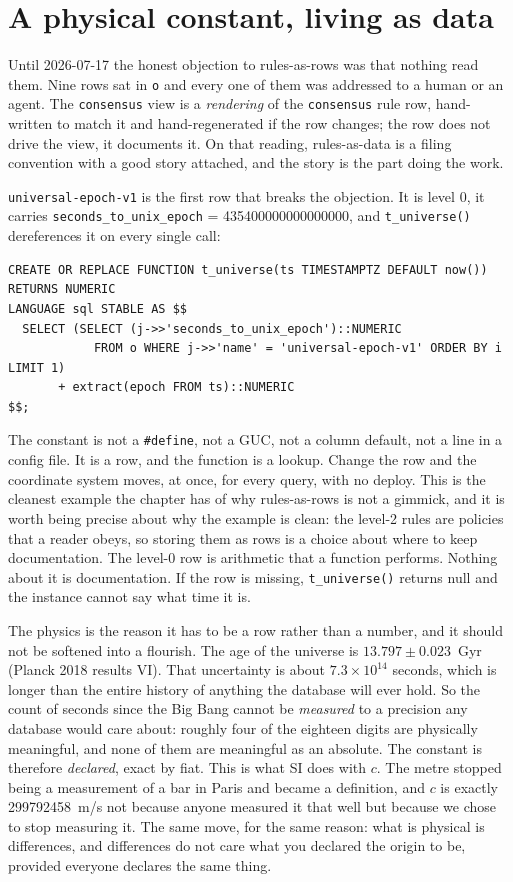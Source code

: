 \section{A physical constant, living as data}

Until 2026-07-17 the honest objection to rules-as-rows was that nothing read them. Nine rows sat in \texttt{o} and every one of them was addressed to a human or an agent. The \texttt{consensus} view is a \emph{rendering} of the \texttt{consensus} rule row, hand-written to match it and hand-regenerated if the row changes; the row does not drive the view, it documents it. On that reading, rules-as-data is a filing convention with a good story attached, and the story is the part doing the work.

\texttt{universal-epoch-v1} is the first row that breaks the objection. It is level 0, it carries \texttt{seconds\_to\_unix\_epoch} = 435400000000000000, and \texttt{t\_universe()} dereferences it on every single call:

\begin{verbatim}
CREATE OR REPLACE FUNCTION t_universe(ts TIMESTAMPTZ DEFAULT now()) RETURNS NUMERIC
LANGUAGE sql STABLE AS $$
  SELECT (SELECT (j->>'seconds_to_unix_epoch')::NUMERIC
            FROM o WHERE j->>'name' = 'universal-epoch-v1' ORDER BY i LIMIT 1)
       + extract(epoch FROM ts)::NUMERIC
$$;
\end{verbatim}

The constant is not a \texttt{\#define}, not a GUC, not a column default, not a line in a config file. It is a row, and the function is a lookup. Change the row and the coordinate system moves, at once, for every query, with no deploy. This is the cleanest example the chapter has of why rules-as-rows is not a gimmick, and it is worth being precise about why the example is clean: the level-2 rules are policies that a reader obeys, so storing them as rows is a choice about where to keep documentation. The level-0 row is arithmetic that a function performs. Nothing about it is documentation. If the row is missing, \texttt{t\_universe()} returns null and the instance cannot say what time it is.

The physics is the reason it has to be a row rather than a number, and it should not be softened into a flourish. The age of the universe is $13.797 \pm 0.023$~Gyr (Planck 2018 results VI). That uncertainty is about $7.3 \times 10^{14}$ seconds, which is longer than the entire history of anything the database will ever hold. So the count of seconds since the Big Bang cannot be \emph{measured} to a precision any database would care about: roughly four of the eighteen digits are physically meaningful, and none of them are meaningful as an absolute. The constant is therefore \emph{declared}, exact by fiat. This is what SI does with $c$. The metre stopped being a measurement of a bar in Paris and became a definition, and $c$ is exactly 299792458~m/s not because anyone measured it that well but because we chose to stop measuring it. The same move, for the same reason: what is physical is differences, and differences do not care what you declared the origin to be, provided everyone declares the same thing.

